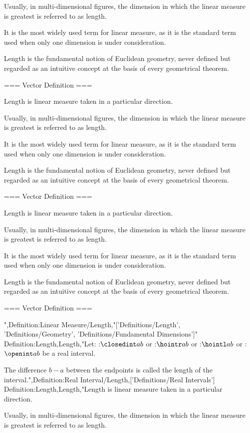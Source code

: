 Usually, in multi-dimensional figures, the dimension in which the linear measure is greatest is referred to as length.

It is the most widely used term for linear measure, as it is the standard term used when only one dimension is under consideration.


Length is the fundamental notion of Euclidean geometry, never defined but regarded as an intuitive concept at the basis of every geometrical theorem.


=== Vector Definition ===

Length is linear measure taken in a particular direction.

Usually, in multi-dimensional figures, the dimension in which the linear measure is greatest is referred to as length.

It is the most widely used term for linear measure, as it is the standard term used when only one dimension is under consideration.


Length is the fundamental notion of Euclidean geometry, never defined but regarded as an intuitive concept at the basis of every geometrical theorem.


=== Vector Definition ===

Length is linear measure taken in a particular direction.

Usually, in multi-dimensional figures, the dimension in which the linear measure is greatest is referred to as length.

It is the most widely used term for linear measure, as it is the standard term used when only one dimension is under consideration.


Length is the fundamental notion of Euclidean geometry, never defined but regarded as an intuitive concept at the basis of every geometrical theorem.


=== Vector Definition ===

",Definition:Linear Measure/Length,"['Definitions/Length', 'Definitions/Geometry', 'Definitions/Fundamental Dimensions']"
Definition:Length,Length,"Let:
:$\closedint a b$
or
:$\hointr a b$
or
:$\hointl a b$
or
:$\openint a b$
be a real interval.


The difference $b - a$ between the endpoints is called the length of the interval.",Definition:Real Interval/Length,['Definitions/Real Intervals']
Definition:Length,Length,"Length is linear measure taken in a particular direction.

Usually, in multi-dimensional figures, the dimension in which the linear measure is greatest is referred to as length.

